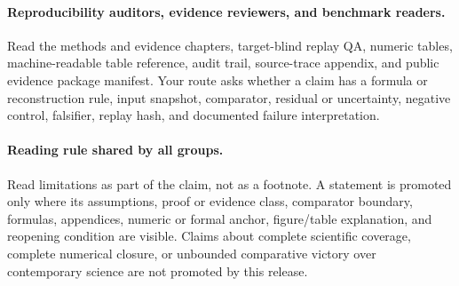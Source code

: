 \paragraph{Reproducibility auditors, evidence reviewers, and benchmark readers.}
Read the methods and evidence chapters, target-blind replay QA, numeric tables,
machine-readable table reference, audit trail, source-trace appendix, and public
evidence package manifest. Your route asks whether a claim has a formula or
reconstruction rule, input snapshot, comparator, residual or uncertainty,
negative control, falsifier, replay hash, and documented failure interpretation.

\paragraph{Reading rule shared by all groups.}
Read limitations as part of the claim, not as a footnote. A statement is
promoted only where its assumptions, proof or evidence class, comparator
boundary, formulas, appendices, numeric or formal anchor, figure/table
explanation, and reopening condition are visible. Claims about complete scientific coverage, complete
numerical closure, or unbounded comparative victory over contemporary science
are not promoted by this release.

\clearpage
